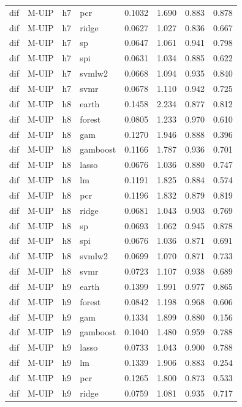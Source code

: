 \begin{ThreePartTable}
\begin{longtable}[t]{llclcccc}
dif & M-UIP & h7 & pcr & 0.1032 & 1.690 & 0.883 & 0.878\\
dif & M-UIP & h7 & ridge & 0.0627 & 1.027 & 0.836 & 0.667\\
dif & M-UIP & h7 & sp & 0.0647 & 1.061 & 0.941 & 0.798\\
dif & M-UIP & h7 & spi & 0.0631 & 1.034 & 0.885 & 0.622\\
dif & M-UIP & h7 & svmlw2 & 0.0668 & 1.094 & 0.935 & 0.840\\
dif & M-UIP & h7 & svmr & 0.0678 & 1.110 & 0.942 & 0.725\\
\addlinespace
dif & M-UIP & h8 & earth & 0.1458 & 2.234 & 0.877 & 0.812\\
dif & M-UIP & h8 & forest & 0.0805 & 1.233 & 0.970 & 0.610\\
dif & M-UIP & h8 & gam & 0.1270 & 1.946 & 0.888 & 0.396\\
dif & M-UIP & h8 & gamboost & 0.1166 & 1.787 & 0.936 & 0.701\\
dif & M-UIP & h8 & lasso & 0.0676 & 1.036 & 0.880 & 0.747\\
dif & M-UIP & h8 & lm & 0.1191 & 1.825 & 0.884 & 0.574\\
dif & M-UIP & h8 & pcr & 0.1196 & 1.832 & 0.879 & 0.819\\
dif & M-UIP & h8 & ridge & 0.0681 & 1.043 & 0.903 & 0.769\\
dif & M-UIP & h8 & sp & 0.0693 & 1.062 & 0.945 & 0.878\\
dif & M-UIP & h8 & spi & 0.0676 & 1.036 & 0.871 & 0.691\\
dif & M-UIP & h8 & svmlw2 & 0.0699 & 1.070 & 0.871 & 0.733\\
dif & M-UIP & h8 & svmr & 0.0723 & 1.107 & 0.938 & 0.689\\
\addlinespace
dif & M-UIP & h9 & earth & 0.1399 & 1.991 & 0.977 & 0.865\\
dif & M-UIP & h9 & forest & 0.0842 & 1.198 & 0.968 & 0.606\\
dif & M-UIP & h9 & gam & 0.1334 & 1.899 & 0.880 & 0.156\\
dif & M-UIP & h9 & gamboost & 0.1040 & 1.480 & 0.959 & 0.788\\
dif & M-UIP & h9 & lasso & 0.0733 & 1.043 & 0.900 & 0.788\\
dif & M-UIP & h9 & lm & 0.1339 & 1.906 & 0.883 & 0.254\\
dif & M-UIP & h9 & pcr & 0.1265 & 1.800 & 0.873 & 0.533\\
dif & M-UIP & h9 & ridge & 0.0759 & 1.081 & 0.935 & 0.717\\

\end{longtable}
\end{ThreePartTable}

